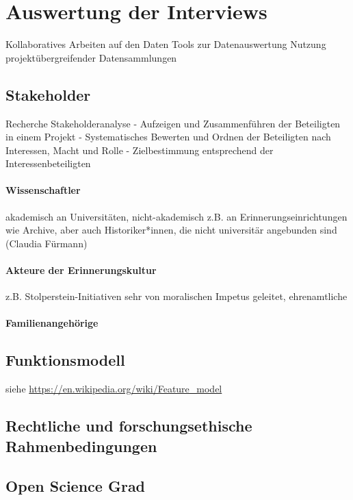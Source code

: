 \section{Auswertung der Interviews}
Kollaboratives Arbeiten auf den Daten
Tools zur Datenauswertung
Nutzung projektübergreifender Datensammlungen 

\subsection{Stakeholder}
Recherche
Stakeholderanalyse
- Aufzeigen und Zusammenführen der Beteiligten in einem Projekt
- Systematisches Bewerten und Ordnen der Beteiligten nach Interessen, Macht und Rolle
- Zielbestimmung entsprechend der Interessenbeteiligten

\paragraph{Wissenschaftler}

akademisch an Universitäten, nicht-akademisch z.B. an Erinnerungseinrichtungen wie Archive, aber auch Historiker*innen, die nicht universitär angebunden sind (Claudia Fürmann)


\paragraph{Akteure der Erinnerungskultur}

z.B. Stolperstein-Initiativen sehr von moralischen Impetus geleitet, ehrenamtliche

\paragraph{Familienangehörige}

\subsection{Funktionsmodell}

siehe \url{https://en.wikipedia.org/wiki/Feature_model}


\subsection{Rechtliche und forschungsethische Rahmenbedingungen}


\subsection{Open Science Grad}


